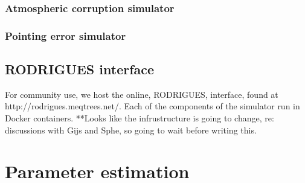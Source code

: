 \subsubsection{Atmospheric corruption simulator}




\subsubsection{Pointing error simulator}
\subsection{RODRIGUES interface}
For community use, we host the online, RODRIGUES, interface, found at http://rodrigues.meqtrees.net/. Each of the components of the simulator run in Docker containers. **Looks like the infrustructure is going to change, re: discussions with Gijs and Sphe, so going to wait before writing this.

\section{Parameter estimation}
